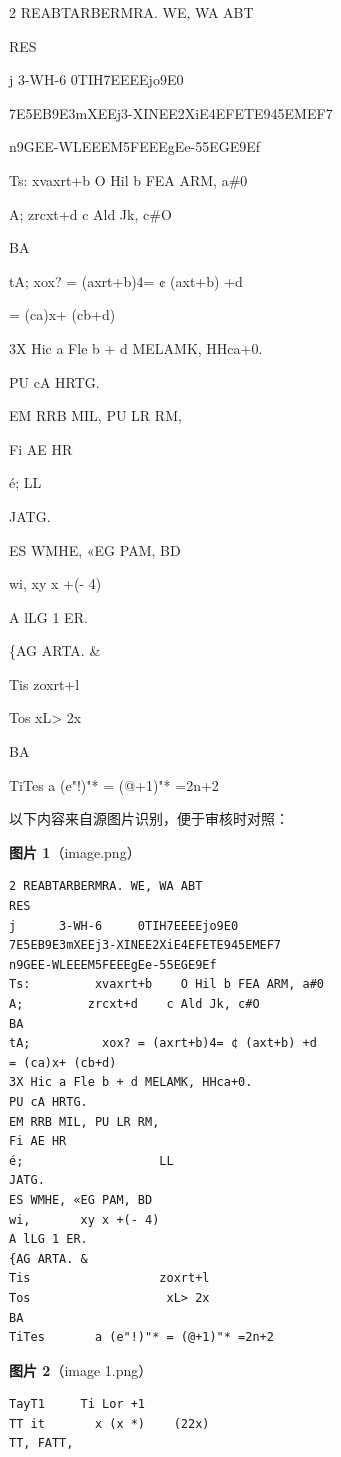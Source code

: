 \begin{homework}

2 REABTARBERMRA. WE, WA ABT

RES

j      3-WH-6     0TIH7EEEEjo9E0

7E5EB9E3mXEEj3-XINEE2XiE4EFETE945EMEF7

n9GEE-WLEEEM5FEEEgEe-55EGE9Ef

Ts:         xvaxrt+b    O Hil b FEA ARM, a\#0

A;         zrcxt+d    c Ald Jk, c\#O

BA

tA;          xox? = (axrt+b)4= ¢ (axt+b) +d

= (ca)x+ (cb+d)

3X Hic a Fle b + d MELAMK, HHca+0.

PU cA HRTG.

EM RRB MIL, PU LR RM,

Fi AE HR

é;                   LL

JATG.

ES WMHE, «EG PAM, BD

wi,       xy x +(- 4)

A lLG 1 ER.

\{AG ARTA. \&

Tis                  zoxrt+l

Tos                   xL> 2x

BA

TiTes       a (e"!)"* = (@+1)"* =2n+2

\end{homework}

\begin{note}
以下内容来自源图片识别，便于审核时对照：

\textbf{图片 1}（image.png）
\begin{Verbatim}[fontsize=\small]
2 REABTARBERMRA. WE, WA ABT
RES
j      3-WH-6     0TIH7EEEEjo9E0
7E5EB9E3mXEEj3-XINEE2XiE4EFETE945EMEF7
n9GEE-WLEEEM5FEEEgEe-55EGE9Ef
Ts:         xvaxrt+b    O Hil b FEA ARM, a#0
A;         zrcxt+d    c Ald Jk, c#O
BA
tA;          xox? = (axrt+b)4= ¢ (axt+b) +d
= (ca)x+ (cb+d)
3X Hic a Fle b + d MELAMK, HHca+0.
PU cA HRTG.
EM RRB MIL, PU LR RM,
Fi AE HR
é;                   LL
JATG.
ES WMHE, «EG PAM, BD
wi,       xy x +(- 4)
A lLG 1 ER.
{AG ARTA. &
Tis                  zoxrt+l
Tos                   xL> 2x
BA
TiTes       a (e"!)"* = (@+1)"* =2n+2
\end{Verbatim}

\textbf{图片 2}（image 1.png）
\begin{Verbatim}[fontsize=\small]
TayT1     Ti Lor +1
TT it       x (x *)    (22x)
TT, FATT,
\end{Verbatim}

\end{note}

